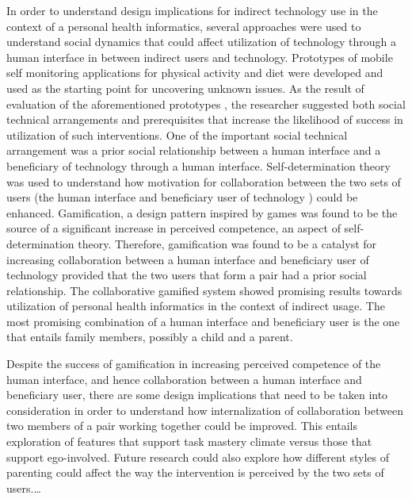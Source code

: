 \documentclass[11pt, oneside]{Thesis} %
\begin{document}
{In order to understand design implications for indirect technology use in the context of a personal health informatics, several approaches were used to understand social dynamics that could affect utilization of technology through a human interface in between indirect users and technology. Prototypes of mobile self monitoring applications for physical activity and diet were developed and used as the starting point for uncovering unknown issues. As the result of evaluation of the aforementioned prototypes , the researcher suggested both social technical arrangements and prerequisites that increase the likelihood of success in utilization of such interventions. One of the important social technical arrangement was a prior social relationship between a human interface and a beneficiary of technology through a human interface. Self-determination theory was used to understand how motivation for collaboration between the two sets of users (the human interface and beneficiary user of technology ) could be enhanced. Gamification, a design pattern inspired by games  was found to be the source of a significant increase in perceived competence, an aspect of self-determination theory. Therefore, gamification was found to be a catalyst for increasing collaboration between a human interface and beneficiary user of technology provided that the two users that form a pair had a prior social relationship. The collaborative gamified system showed promising results towards utilization of personal health informatics in the context of indirect usage. The most promising combination of a human interface and beneficiary user is the one that entails family members, possibly a child and a parent.

Despite the success of gamification in increasing perceived competence of the human interface, and hence collaboration between a human interface and beneficiary user, there are some design implications that need to be taken into consideration in order to understand how internalization of collaboration between two members of a pair working together could be improved. This entails exploration of features that support task mastery climate versus those that support ego-involved. Future research could also explore how different styles of parenting could affect the way the intervention is perceived by the two sets of users.\ldots
}

\clearpage %

\end{document}
